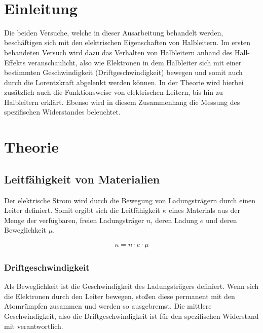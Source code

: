 \documentclass[a4paper]{scrartcl}
\def\header#1#2{
  \begin{center}
    {\Large #1}\\
    {#2}
  \end{center}
}
\numberwithin{equation}{subsection}
\begin{document}
\vspace{10pt}
\header{\HEADDING}{\SUBHEADDING}

\tableofcontents

\newpage

\section{Einleitung}
Die beiden Versuche, welche in dieser Ausarbeitung behandelt werden, beschäftigen sich mit den elektrischen Eigenschaften von Halbleitern. Im ersten behandeten Versuch wird dazu das Verhalten von Halbleitern anhand des Hall-Effekts veranschaulicht, also wie Elektronen in dem Halbleiter sich mit einer bestimmten Geschwindigkeit (Driftgeschwindigkeit) bewegen und somit auch durch die Lorentzkraft abgelenkt werden können. In der Theorie wird hierbei zusätzlich auch die Funktionsweise von elektrischen Leitern, bis hin zu Halbleitern erklärt.
Ebenso wird in diesem Zusammenhang die Messung des spezifischen Widerstandes beleuchtet.


\newpage

\section{Theorie}
\subsection{Leitfähigkeit von Materialien}
Der elektrische Strom wird durch die Bewegung von Ladungsträgern durch einen Leiter definiert.
Somit ergibt sich die Leitfähigkeit $\kappa$ eines Materials aus der Menge der verfügbaren, freien Ladungsträger $n$, deren Ladung $e$ und deren Beweglichkeit $\mu$. \cite{horn}

\begin{align}
\kappa = n \cdot e \cdot \mu
\end{align}

\subsubsection{Driftgeschwindigkeit}
Als Beweglichkeit ist die Geschwindigkeit des Ladungsträgers definiert. Wenn sich die Elektronen durch den Leiter bewegen, stoßen diese permanent mit den Atomrümpfen zusammen und werden so ausgebremst. Die mittlere Geschwindigkeit, also die Driftgeschwindigkeit ist für den spezifischen Widerstand mit verantwortlich. \cite{werk}
\end{document}
